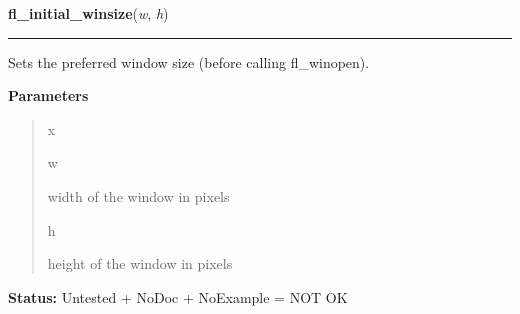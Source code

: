 \hspace{.8\funcindent}\begin{boxedminipage}{\funcwidth}

    \raggedright \textbf{fl\_initial\_winsize}(\textit{w}, \textit{h})

    \vspace{-1.5ex}

    \rule{\textwidth}{0.5\fboxrule}
\setlength{\parskip}{2ex}
    Sets the preferred window size (before calling fl\_winopen).

\setlength{\parskip}{1ex}
      \textbf{Parameters}
      \vspace{-1ex}

      \begin{quote}
        \begin{Ventry}{x}

          \item[w]

          width of the window in pixels

          \item[h]

          height of the window in pixels

        \end{Ventry}

      \end{quote}

\textbf{Status:} Untested + NoDoc + NoExample = NOT OK



    \end{boxedminipage}

    \label{xformslib:library:fl_winsize}

    \vspace{0.5ex}

